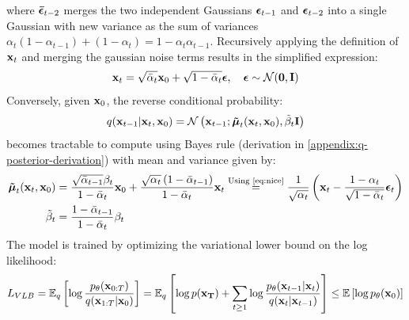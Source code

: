 where $\boldsymbol{\mathbf{\bar{\epsilon}}}_{t-2}$ merges the two independent Gaussians $\boldsymbol{\mathbf{\epsilon}}_{t-1}$ and $\boldsymbol{\mathbf{\epsilon}}_{t-2}$ into a single Gaussian with new variance as the sum of variances $\alpha_t (1 - \alpha_{t-1}) + (1 - \alpha_{t}) = 1 - \alpha_t \alpha_{t-1}$. Recursively applying the definition of $\boldsymbol{\mathbf{x}}_t$ and merging the gaussian noise terms results in the simplified expression:
\begin{equation} \label{eq:nice}
    \boldsymbol{\mathbf{x}}_t = \sqrt{\bar{\alpha}_t}\boldsymbol{\mathbf{x}}_0 + \sqrt{1 - \bar{\alpha}_t} \boldsymbol{\mathbf{\epsilon}}, \quad \boldsymbol{\mathbf{\epsilon}} \sim \mathcal{N}(\boldsymbol{\mathbf{0}}, \boldsymbol{\mathbf{I}})
\end{equation}
Conversely, given $\boldsymbol{\mathbf{x}}_0$, the reverse conditional probability:
\begin{equation*}
    q(\boldsymbol{\mathbf{x}}_{t-1} \vert \boldsymbol{\mathbf{x}}_t, \boldsymbol{\mathbf{x}}_0) = \mathcal{N}\left( \boldsymbol{\mathbf{x}}_{t-1}; \boldsymbol{\mathbf{\tilde{\mu}}}_t(\boldsymbol{\mathbf{x}}_t, \boldsymbol{\mathbf{x}}_0), \tilde{\beta}_t \boldsymbol{\mathbf{I}} \right)
\end{equation*}
becomes tractable to compute using Bayes rule (derivation in \cref{appendix:q-posterior-derivation}) with mean and variance given by:
\begin{align} \label{eq:x-t-min-1-from-x-t}
    \boldsymbol{\mathbf{\tilde{\mu}}}_t(\boldsymbol{\mathbf{x}}_t, \boldsymbol{\mathbf{x}}_0) &= \frac{\sqrt{\bar{\alpha}_{t-1}} \beta_t}{1-\bar{\alpha}_t} \boldsymbol{\mathbf{x}}_0+\frac{\sqrt{\alpha_t}\left(1-\bar{\alpha}_{t-1}\right)}{1-\bar{\alpha}_t} \boldsymbol{\mathbf{x}}_t \overset{\text{Using \ref{eq:nice}}}{=} \frac{1}{\sqrt{\alpha_t}}\left(\boldsymbol{\mathbf{x}}_t-\frac{1-\alpha_t}{\sqrt{1-\bar{\alpha}_t}} \boldsymbol{\mathbf{\epsilon}}_t\right) \\
    \tilde{\beta}_t &= \frac{1-\bar{\alpha}_{t-1}}{1-\bar{\alpha}_t} \beta_t
\end{align}
The model is trained by optimizing the variational lower bound on the log likelihood:
\begin{equation}
    L_{VLB}
        = \mathbb{E}_q\left[ \log \frac{p_\theta(\boldsymbol{\mathbf{x}}_{0:T})}{q(\boldsymbol{\mathbf{x}}_{1:T} \vert \boldsymbol{\mathbf{x}}_0)}\right]
        = \mathbb{E}_q\left[\log p(\boldsymbol{\mathbf{x_T}}) + \sum_{t \geq 1} \log \frac{p_\theta(\boldsymbol{\mathbf{x}}_{t-1} \vert \boldsymbol{\mathbf{x}}_{t})}{q(\boldsymbol{\mathbf{x}}_t \vert \boldsymbol{\mathbf{x}}_{t-1})}
        \right]
        \leq \mathbb{E}\left[\log p_\theta(\boldsymbol{\mathbf{x}}_0)\right]
\end{equation}
